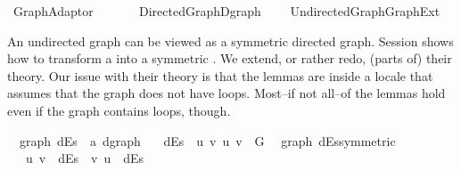 %
\begin{isabellebody}%
%
%
\isadelimdocument
%
\endisadelimdocument
%
\isatagdocument
%
\isamarkuptrue%
%
\endisatagdocument
{\isafolddocument}%
%
\isadelimdocument
%
\endisadelimdocument
%
\isadelimtheory
%
\endisadelimtheory
%
\isatagtheory
{}\isamarkupfalse%
\ Graph{\isacharunderscore}{\kern0pt}Adaptor\isanewline
\ \ \isanewline
\ \ \ \ {\isachardoublequoteopen}{\isachardot}{\kern0pt}{\isachardot}{\kern0pt}{\isacharslash}{\kern0pt}Directed{\isacharunderscore}{\kern0pt}Graph{\isacharslash}{\kern0pt}Dgraph{\isachardoublequoteclose}\isanewline
\ \ \ \ {\isachardoublequoteopen}{\isachardot}{\kern0pt}{\isachardot}{\kern0pt}{\isacharslash}{\kern0pt}Undirected{\isacharunderscore}{\kern0pt}Graph{\isacharslash}{\kern0pt}Graph{\isacharunderscore}{\kern0pt}Ext{\isachardoublequoteclose}\isanewline
{}%
\endisatagtheory
{\isafoldtheory}%
%
\isadelimtheory
%
\endisadelimtheory
%
\begin{isamarkuptext}%
An undirected graph can be viewed as a symmetric directed graph. Session  shows how to
transform a  into a symmetric . We extend, or rather redo, (parts of)
their theory. Our issue with their theory is that the lemmas are inside a locale that assumes that
the graph does not have loops. Most--if not all--of the lemmas hold even if the graph contains
loops, though.%
\end{isamarkuptext}\isamarkuptrue%
\isamarkupfalse%
\ {\isacharparenleft}{\kern0pt}\ graph{\isacharparenright}{\kern0pt}\ dEs\ {\isacharcolon}{\kern0pt}{\isacharcolon}{\kern0pt}\ {\isachardoublequoteopen}{\isacharprime}{\kern0pt}a\ dgraph{\isachardoublequoteclose}\ \isanewline
\ \ {\isachardoublequoteopen}dEs\ {\isasymequiv}\ {\isacharbraceleft}{\kern0pt}{\isacharparenleft}{\kern0pt}u{\isacharcomma}{\kern0pt}\ v{\isacharparenright}{\kern0pt}{\isachardot}{\kern0pt}\ {\isacharbraceleft}{\kern0pt}u{\isacharcomma}{\kern0pt}\ v{\isacharbraceright}{\kern0pt}\ {\isasymin}\ G{\isacharbraceright}{\kern0pt}{\isachardoublequoteclose}\isanewline
\isanewline
{}\isamarkupfalse%
\ {\isacharparenleft}{\kern0pt}\ graph{\isacharparenright}{\kern0pt}\ dEs{\isacharunderscore}{\kern0pt}symmetric{\isacharcolon}{\kern0pt}\isanewline
\ \ \ {\isachardoublequoteopen}{\isacharparenleft}{\kern0pt}u{\isacharcomma}{\kern0pt}\ v{\isacharparenright}{\kern0pt}\ {\isasymin}\ dEs\ {\isasymlongleftrightarrow}\ {\isacharparenleft}{\kern0pt}v{\isacharcomma}{\kern0pt}\ u{\isacharparenright}{\kern0pt}\ {\isasymin}\ dEs{\isachardoublequoteclose}\isanewline

\end{isabellebody}
